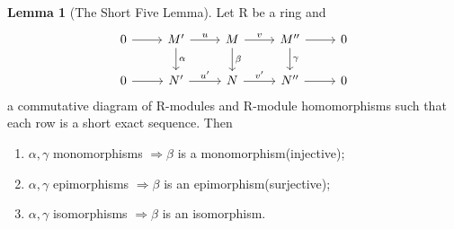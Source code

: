 \documentclass[a4paper,12pt]{article}
\theoremstyle{definition}
\newtheorem{lem}[defn]{Lemma}
\begin{document}
\begin{lem}[The Short Five Lemma]
    Let $\mathrm{R}$ be a ring and
    \begin{equation*}
        \begin{tikzcd}
            0 & {M^{\prime}} & M & {M^{\prime\prime}} & 0 \\
            0 & {N^{\prime}} & N & {N^{\prime\prime}} & 0
            \arrow[from=1-1, to=1-2]
            \arrow["u", from=1-2, to=1-3]
            \arrow["v", from=1-3, to=1-4]
            \arrow[from=1-4, to=1-5]
            \arrow["\gamma", from=1-4, to=2-4]
            \arrow["\beta", from=1-3, to=2-3]
            \arrow["\alpha", from=1-2, to=2-2]
            \arrow[from=2-1, to=2-2]
            \arrow["{u^{\prime}}", from=2-2, to=2-3]
            \arrow["{v^{\prime}}", from=2-3, to=2-4]
            \arrow[from=2-4, to=2-5]
        \end{tikzcd}
    \end{equation*}
    a commutative diagram of $\mathrm{R}$-modules and $\mathrm{R}$-module homomorphisms such that each row is a short exact sequence. Then
    \begin{enumerate}[(1)]
        \item  $\alpha, \gamma$ monomorphisms $\Rightarrow \beta$ is a monomorphism(injective);
        \item  $\alpha, \gamma$ epimorphisms $\Rightarrow \beta$ is an epimorphism(surjective);
        \item $\alpha, \gamma$ isomorphisms $\Rightarrow \beta$ is an isomorphism.
    \end{enumerate}
    \label{lemma:short five lemma}
\end{lem}
\end{document}
